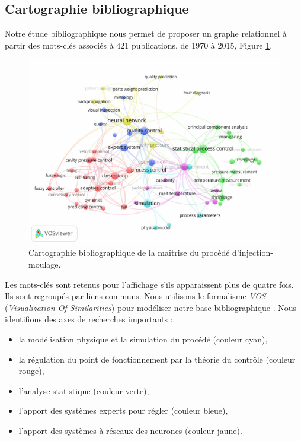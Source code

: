 \FloatBarrier
\subsection{Cartographie bibliographique}
Notre étude bibliographique \cite{nagorny_injection_2017} nous permet de proposer un graphe relationnel à partir des mots-clés associés à 421 publications, de 1970 à 2015, Figure \ref{fig:cartographie}.

\begin{figure}[hbtp]
	\centering
	\includegraphics[width=\textwidth,height=\textheight,keepaspectratio]{../Chap1/Figures/tagMapFinalPubliOccurence.jpg}
	\caption{Cartographie bibliographique de la maîtrise du procédé d'injection-moulage.}
	\label{fig:cartographie}
\end{figure}

Les mots-clés sont retenus pour l’affichage s’ils apparaissent plus de quatre fois.
Ils sont regroupés par liens communs.
Nous utilisons le formalisme \textit{VOS} (\textit{Visualization Of Similarities}) \cite{vaneck_vos_2006} pour modéliser notre base bibliographique \cite{van_eck_comparison_2010}.
Nous identifions des axes de recherches importants :
\begin{itemize}
	\item la modélisation physique et la simulation du procédé (couleur cyan),
	\item la régulation du point de fonctionnement par la théorie du contrôle (couleur rouge),
	\item l’analyse statistique (couleur verte),
	\item l’apport des systèmes experts pour régler (couleur bleue),
	\item l’apport des systèmes à réseaux des neurones (couleur jaune).
\end{itemize}

